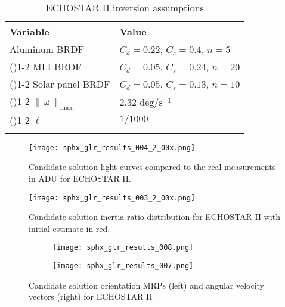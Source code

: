 \documentclass[a4paper,twocolumn]{spaceDebrisC} %
\newcommand{\grule}[0]{\arrayrulecolor{darkgray}\cmidrule(){1-2}}
\newcommand{\brule}[0]{\arrayrulecolor{black} \bottomrule}
\newcommand{\vctr}[1]{\bm{#1}}
\newcommand{\norm}[1]{\left\lVert#1\right\rVert}
\newcommand{\figbig}[0]{0.5\textwidth}
\newcommand{\figsmall}[0]{0.3\textwidth}
\begin{document}
\begin{table}[H]
  \centering
  \renewcommand{\arraystretch}{1.3} %
  \caption{ECHOSTAR II inversion assumptions}
  \vspace*{6pt}
  \begin{tabular}{@{} l l @{}}
    \toprule
    Variable & Value \\ \midrule
    Aluminum BRDF & $C_d=0.22$, $C_s=0.4$, $n=5$ \\ \grule
    MLI BRDF & $C_d=0.05$, $C_s=0.24$, $n=20$ \\ \grule
    Solar panel BRDF & $C_d=0.05$, $C_s=0.13$, $n=10$ \\ \grule
    $\norm{\vctr{\omega}}_\text{max}$ & $2.32$ $\text{deg} / \text{s}^{-1}$ \\ \grule
    $\ell$ & $1/1000$ \\ \brule
  \end{tabular}
  \label{tb:case3_ass}
\end{table}

\begin{figure}[H]
  \centering
  \texttt{[image: sphx\_glr\_results\_004\_2\_00x.png]}
  \caption{Candidate solution light curves compared to the real measurements in ADU for ECHOSTAR II.}
  \label{fig:case3_s}
\end{figure}

\begin{figure}[H]
  \centering
  \texttt{[image: sphx\_glr\_results\_003\_2\_00x.png]}
  \caption{Candidate solution inertia ratio distribution for ECHOSTAR II with initial estimate in red.}
  \label{fig:case3_i}
\end{figure}

\begin{figure}[H]
  \centering
  \begin{subfigure}[t]{0.23\textwidth}
    \centering
    \texttt{[image: sphx\_glr\_results\_008.png]}
    \caption{}
    \label{fig:case3_pwa}
  \end{subfigure}
  \hfill
  \begin{subfigure}[t]{0.23\textwidth}
    \centering
    \texttt{[image: sphx\_glr\_results\_007.png]}
    \caption{}
    \label{fig:case3_pwb}
  \end{subfigure}

  \caption{Candidate solution orientation MRPs (left) and angular velocity vectors (right) for ECHOSTAR II}
  \label{fig:case3_pw}
\end{figure}
\end{document}
